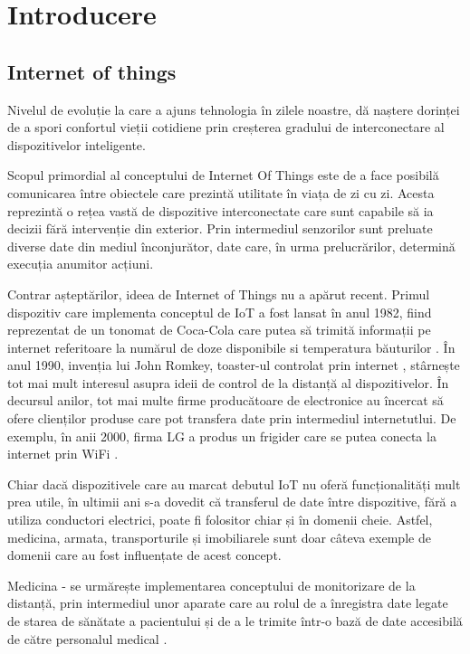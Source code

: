 \chapter{Introducere}\label{ch:1intro}

\section{Internet of things}
	Nivelul de evoluție la care a ajuns tehnologia în zilele noastre, dă naștere dorinței de a spori confortul vieții cotidiene prin creșterea gradului de interconectare al dispozitivelor inteligente.

	Scopul primordial al conceptului de Internet Of Things este de a face posibilă comunicarea între obiectele care prezintă utilitate în viața de zi cu zi. Acesta reprezintă o rețea vastă de dispozitive interconectate care sunt capabile să ia decizii fără intervenție din exterior. Prin intermediul senzorilor sunt preluate diverse date din mediul înconjurător, date care, în urma prelucrărilor, determină execuția anumitor acțiuni.

	Contrar așteptărilor, ideea de Internet of Things nu a apărut recent. Primul dispozitiv care implementa conceptul de IoT a fost lansat în anul 1982, fiind reprezentat de un tonomat de Coca-Cola care putea să trimită informații pe internet referitoare la numărul de doze disponibile si temperatura băuturilor \cite{cokeMachine}. În anul 1990, invenția lui John Romkey, toaster-ul controlat prin internet \cite{simoniot}, stârnește tot mai mult interesul asupra ideii de control de la distanță al dispozitivelor. În decursul anilor, tot mai multe firme producătoare de electronice au încercat să ofere clienților produse care pot transfera date prin intermediul internetutlui. De exemplu, în anii 2000, firma LG a produs un frigider care se putea conecta la internet prin WiFi \cite{simoniot}.

	Chiar dacă dispozitivele care au marcat debutul IoT nu oferă funcționalități mult prea utile, în ultimii ani s-a dovedit că transferul de date între dispozitive, fără a utiliza conductori electrici, poate fi folositor chiar și în domenii cheie. Astfel, medicina, armata, transporturile și imobiliarele sunt doar câteva exemple de domenii care au fost influențate de acest concept.  

	Medicina - se urmărește implementarea conceptului de monitorizare de la distanță, prin intermediul unor aparate care au rolul de a înregistra date legate de starea de sănătate a pacientului și de a le trimite într-o bază de date accesibilă de către personalul medical \cite{medical}.

